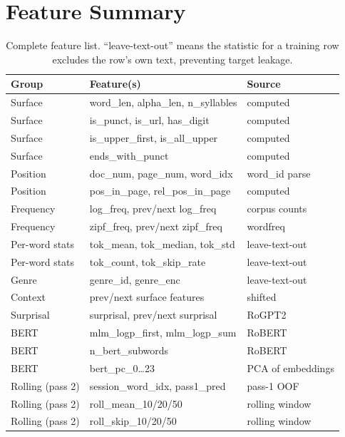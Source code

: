 \documentclass[12pt]{article}
\begin{document}
\appendix

\section{Feature Summary}
\label{sec:appendix}

\begin{table}[h]
\centering
\small
\begin{tabular}{lll}
\toprule
\textbf{Group} & \textbf{Feature(s)} & \textbf{Source} \\
\midrule
Surface & word\_len, alpha\_len, n\_syllables & computed \\
Surface & is\_punct, is\_url, has\_digit & computed \\
Surface & is\_upper\_first, is\_all\_upper & computed \\
Surface & ends\_with\_punct & computed \\
Position & doc\_num, page\_num, word\_idx & word\_id parse \\
Position & pos\_in\_page, rel\_pos\_in\_page & computed \\
Frequency & log\_freq, prev/next log\_freq & corpus counts \\
Frequency & zipf\_freq, prev/next zipf\_freq & wordfreq \cite{speer2022wordfreq} \\
Per-word stats & tok\_mean, tok\_median, tok\_std & leave-text-out \\
Per-word stats & tok\_count, tok\_skip\_rate & leave-text-out \\
Genre & genre\_id, genre\_enc & leave-text-out \\
Context & prev/next surface features & shifted \\
Surprisal & surprisal, prev/next surprisal & RoGPT2 \\
BERT & mlm\_logp\_first, mlm\_logp\_sum & RoBERT \cite{hodivoianu2025predicting} \\
BERT & n\_bert\_subwords & RoBERT \\
BERT & bert\_pc\_0\ldots23 & PCA of embeddings \\
Rolling (pass 2) & session\_word\_idx, pass1\_pred & pass-1 OOF \\
Rolling (pass 2) & roll\_mean\_10/20/50 & rolling window \\
Rolling (pass 2) & roll\_skip\_10/20/50 & rolling window \\
\bottomrule
\end{tabular}
\caption{Complete feature list. ``leave-text-out'' means the statistic for a training row excludes the row's own text, preventing target leakage.}
\label{tab:features}
\end{table}
\end{document}
